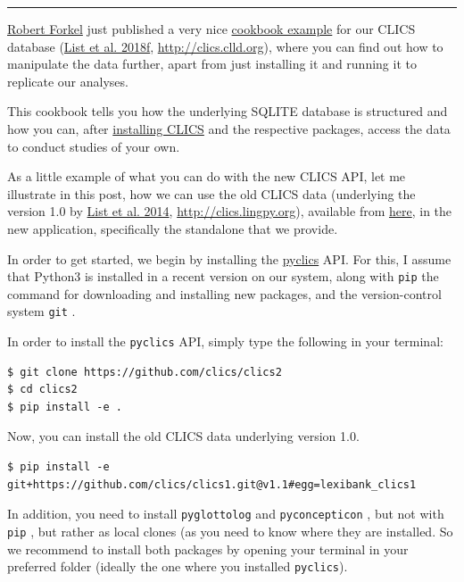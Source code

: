 \documentclass[
  a4paper,
  14pt,
  oneside,
  tablecaptionabove
]{scrbook}
\begin{document}
\begin{center}\rule{0.5\linewidth}{1pt}\end{center}

\href{https://github.com/xrotwang/}{Robert Forkel} just published a very
nice
\href{https://github.com/clics/clics2/tree/master/cookbook}{cookbook
example} for our CLICS database (\href{http://bibliography.lingpy.org?key=List2018f}{List et al. 2018f},
\url{http://clics.clld.org}), where you can find out how to manipulate
the data further, apart from just installing it and running it to
replicate our analyses.

This cookbook tells you how the underlying SQLITE database is structured
and how you can, after \href{https://github.com/clics/clics2}{installing
CLICS} and the respective packages, access the data to conduct studies
of your own.

As a little example of what you can do with the new CLICS API, let me
illustrate in this post, how we can use the old CLICS data (underlying
the version 1.0 by
\href{http://bibliography.lingpy.org?key=List2014f}{List et al. 2014},
\url{http://clics.lingpy.org}), available from
\href{https://github.com/clics/clics1}{here}, in the new application,
specifically the standalone that we provide.


In order to get started, we begin by installing the
\href{https://github.com/clics/clics2}{pyclics} API. For this, I assume
that Python3 is installed in a recent version on our system, along with
\lstinline!pip! the command for downloading and installing new packages,
and the version-control system \lstinline!git! .

In order to install the \lstinline!pyclics! API, simply type the
following in your terminal:

\begin{lstlisting}
$ git clone https://github.com/clics/clics2
$ cd clics2
$ pip install -e .
\end{lstlisting}

Now, you can install the old CLICS data underlying version 1.0.

\begin{lstlisting}
$ pip install -e git+https://github.com/clics/clics1.git@v1.1#egg=lexibank_clics1
\end{lstlisting}

In addition, you need to install \lstinline!pyglottolog! and
\lstinline!pyconcepticon! , but not with \lstinline!pip! , but rather as
local clones (as you need to know where they are installed. So we
recommend to install both packages by opening your terminal in your
preferred folder (ideally the one where you installed
\lstinline!pyclics!).
\end{document}
